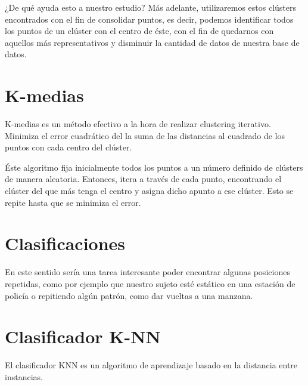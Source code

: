 \documentclass[a4paper,12pt]{article}
\begin{document}
%           		

¿De qu\'e ayuda esto a nuestro estudio? M\'as adelante, utilizaremos estos cl\'usters encontrados con el fin de consolidar puntos, es decir, podemos identificar todos los puntos de un cl\'uster con el centro de \'este, con el fin de quedarnos con aquellos m\'as representativos y disminuir la cantidad de datos de nuestra base de datos.


\section{K-medias}

K-medias es un m\'etodo efectivo a la hora de realizar clustering iterativo. Minimiza el error cuadr\'atico del la suma de las distancias al cuadrado de los puntos con cada centro del cl\'uster. 

\'Este algoritmo fija inicialmente todos los puntos a un n\'umero definido de cl\'usters de manera aleatoria. Entonces, itera a trav\'es de cada punto, encontrando el cl\'uster del que m\'as tenga el centro y asigna dicho apunto a ese cl\'uster. Esto se repite hasta que se minimiza el error.

\section{Clasificaciones}

En este sentido ser\'ia una tarea interesante poder encontrar algunas posiciones repetidas, como por ejemplo que nuestro sujeto est\'e est\'atico en una estaci\'on de polic\'ia o repitiendo alg\'un patr\'on, como dar vueltas a una manzana.

\section{Clasificador K-NN}

El clasificador KNN es un algoritmo de aprendizaje basado en la distancia entre instancias. 
\end{document}
